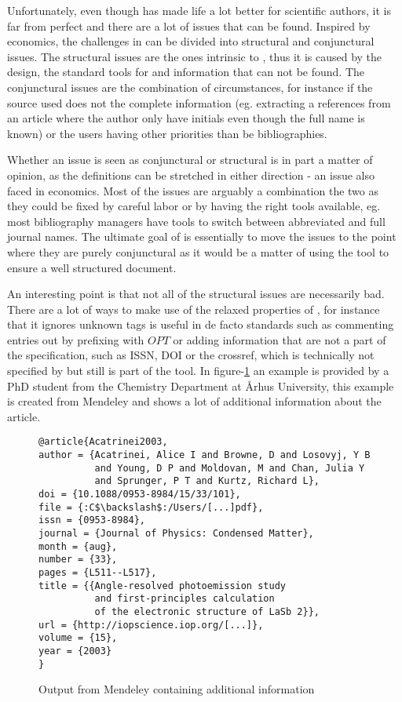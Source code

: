 Unfortunately, even though {\bibtex} has made life a lot better for
scientific authors, it is far from perfect and there are a lot of
issues that can be found.  Inspired by economics, the challenges in
{\bibtex} can be divided into structural and conjunctural issues.  The
structural issues are the ones intrinsic to {\bibtex}, thus it is
caused by the design, the standard tools for {\bibtex} and information
that can not be found.  The conjunctural issues are the combination of
circumstances, for instance if the source used does not the complete
information (eg. extracting a references from an article where the
author only have initials even though the full name is known) or the
users having other priorities than be bibliographies.

Whether an issue is seen as conjunctural or structural is in part a
matter of opinion, as the definitions can be stretched in either
direction - an issue also faced in economics.  Most of the issues are
arguably a combination the two as they could be fixed by careful labor
or by having the right tools available, eg. most bibliography managers
have tools to switch between abbreviated and full journal names.  The
ultimate goal of {\Orangutan} is essentially to move the issues to the
point where they are purely conjunctural as it would be a matter of
using the tool to ensure a well structured {\bibtex} document.

An interesting point is that not all of the structural issues are
necessarily bad.  There are a lot of ways to make use of the relaxed
properties of {\bibtex}, for instance that it ignores unknown tags is
useful in de facto standards such as commenting entries out by
prefixing with $OPT$ or adding information that are not a part of the
{\bibtex} specification, such as ISSN, DOI or the crossref, which is
technically not specified by {\bibtex} but still is part of the tool.
In figure-\ref{fig:mendeley_output} an example is provided by a PhD
student from the Chemistry Department at Århus University, this
example is created from Mendeley and shows a lot of additional
information about the article.

\begin{figure}[ht]
  \centering
\begin{small}
\begin{verbatim}
@article{Acatrinei2003,
author = {Acatrinei, Alice I and Browne, D and Losovyj, Y B 
          and Young, D P and Moldovan, M and Chan, Julia Y
          and Sprunger, P T and Kurtz, Richard L},
doi = {10.1088/0953-8984/15/33/101},
file = {:C$\backslash$:/Users/[...]pdf},
issn = {0953-8984},
journal = {Journal of Physics: Condensed Matter},
month = {aug},
number = {33},
pages = {L511--L517},
title = {{Angle-resolved photoemission study 
          and first-principles calculation 
          of the electronic structure of LaSb 2}},
url = {http://iopscience.iop.org/[...]},
volume = {15},
year = {2003}
}
\end{verbatim}
\end{small}
  \caption{Output from Mendeley containing additional information}
\label{fig:mendeley_output}
\end{figure}

